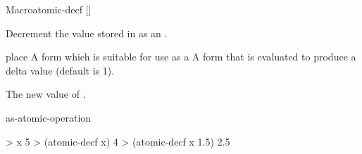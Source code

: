 \documentclass[10pt,twoside,english,pdftex]{article}
\begin{document}
\begin{functiondoc}{Macro}{atomic-decf}{ []
      \returns{} }
%

\fnsyntax \fnpurpose Decrement the value stored in  as an
          .

\fnpackage {}

\fnmodule {}

\fnargs
\begin{args}{place}
\arg[place] A form which is suitable for use as a
 A form that is evaluated to produce a delta value (default is 1).
\end{args}

\fnreturns The new value of . 

\begin{alsos}{as-atomic-operation}
\end{alsos}

\fnexamples
\begin{example}
> x
5
> (atomic-decf x)
4
> (atomic-decf x 1.5)
2.5
\end{example}

\end{functiondoc}

\end{document}
